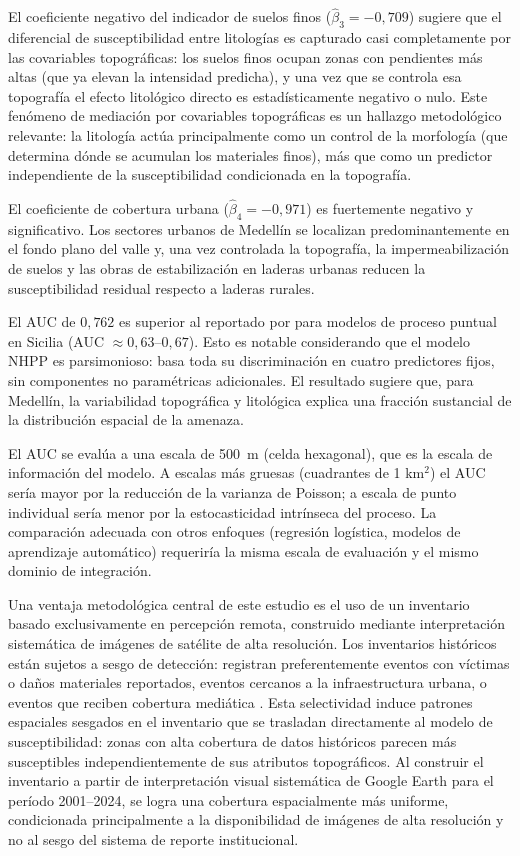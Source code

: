 \documentclass[12pt, a4paper]{article}
\begin{document}
El coeficiente negativo del indicador de suelos finos ($\hat{\beta}_3 = -0{,}709$)
sugiere que el diferencial
de susceptibilidad entre litologías es capturado casi completamente por las
covariables topográficas: los suelos finos ocupan zonas con pendientes más
altas (que ya elevan la intensidad predicha), y una vez que se controla esa
topografía el efecto litológico directo es estadísticamente negativo o nulo. Este
fenómeno de mediación por covariables topográficas es un hallazgo metodológico
relevante: la litología actúa principalmente como un control de la morfología (que
determina dónde se acumulan los materiales finos), más que como un predictor
independiente de la susceptibilidad condicionada en la topografía.

El coeficiente de cobertura urbana ($\hat{\beta}_4 = -0{,}971$) es
fuertemente negativo y significativo. Los sectores urbanos de Medellín
se localizan predominantemente en el fondo plano del valle y, una vez controlada
la topografía, la impermeabilización de suelos y las obras de estabilización en laderas
urbanas reducen la susceptibilidad residual respecto a laderas rurales.

El AUC de $0{,}762$ es superior al reportado por \citet{lombardo2019}
para modelos de proceso puntual en
Sicilia (AUC $\approx 0{,}63$--$0{,}67$). Esto es notable considerando que el
modelo NHPP es parsimonioso: basa toda su discriminación en cuatro predictores
fijos, sin componentes no paramétricas adicionales. El resultado sugiere que,
para Medellín, la variabilidad topográfica y litológica explica una
fracción sustancial de la distribución espacial de la amenaza.

El AUC se evalúa a una escala de \SI{500}{m} (celda hexagonal), que es la
escala de información del modelo. A escalas más gruesas (cuadrantes de 1 km$^2$)
el AUC sería mayor por la reducción de la varianza de Poisson; a escala de punto
individual sería menor por la estocasticidad intrínseca del proceso. La comparación
adecuada con otros enfoques (regresión logística, modelos de aprendizaje automático)
requeriría la misma escala de evaluación y el mismo dominio de integración.

Una ventaja metodológica central de este estudio es el uso de un inventario
basado exclusivamente en percepción remota, construido mediante interpretación
sistemática de imágenes de satélite de alta resolución. Los inventarios históricos
están sujetos a sesgo de detección: registran preferentemente
eventos con víctimas o daños materiales reportados, eventos cercanos a la
infraestructura urbana, o eventos que reciben cobertura mediática
\citep{guzzetti2012}. Esta selectividad induce patrones espaciales sesgados
en el inventario que se trasladan directamente al modelo de susceptibilidad:
zonas con alta cobertura de datos históricos parecen más susceptibles
independientemente de sus atributos topográficos. Al construir el inventario a
partir de interpretación visual sistemática de Google Earth para el período
2001--2024, se logra una cobertura espacialmente más uniforme, condicionada
principalmente a la disponibilidad de imágenes de alta resolución y no al sesgo
del sistema de reporte institucional.
\end{document}
